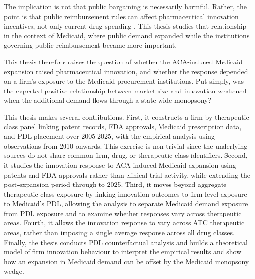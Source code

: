 \documentclass[12pt]{article}
\begin{document}
The implication is not that public bargaining is necessarily harmful. Rather, the point is that public reimbursement rules can affect pharmaceutical innovation incentives, not only current drug spending \citep{lakdawalla2009innovation, lakdawalla2018economics}. This thesis studies that relationship in the context of Medicaid, where public demand expanded while the institutions governing public reimbursement became more important.

This thesis therefore raises the question of whether the ACA-induced Medicaid expansion raised pharmaceutical innovation, and whether the response depended on a firm's exposure to the Medicaid procurement institutions. Put simply, was the expected positive relationship between market size and innovation weakened when the additional demand flows through a state-wide monopsony?

This thesis makes several contributions. First, it constructs a firm-by-therapeutic-class panel linking patent records, FDA approvals, Medicaid prescription data, and PDL placement over 2005-2025, with the empirical analysis using observations from 2010 onwards. This exercise is non-trivial since the underlying sources do not share common firm, drug, or therapeutic-class identifiers. Second, it studies the innovation response to ACA-induced Medicaid expansion using patents and FDA approvals rather than clinical trial activity, while extending the post-expansion period through to 2025. Third, it moves beyond aggregate therapeutic-class exposure by linking innovation outcomes to firm-level exposure to Medicaid's PDL, allowing the analysis to separate Medicaid demand exposure from PDL exposure and to examine whether responses vary across therapeutic areas. Fourth, it allows the innovation response to vary across ATC therapeutic areas, rather than imposing a single average response across all drug classes. Finally, the thesis conducts PDL counterfactual analysis and builds a theoretical model of firm innovation behaviour to interpret the empirical results and show how an expansion in Medicaid demand can be offset by the Medicaid monopsony wedge.
\end{document}
